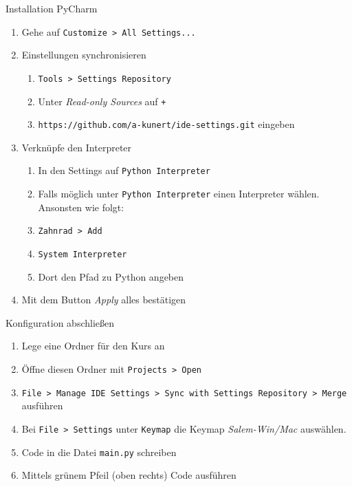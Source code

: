 \begin{frame}
\begin{block}{Installation PyCharm}
\vspace{2pt}
\begin{enumerate}
\item Gehe auf \texttt{Customize > All Settings...}
\item Einstellungen synchronisieren
\begin{enumerate}
	\item \texttt{Tools > Settings Repository}
	\item Unter \textit{Read-only Sources} auf \texttt{+}
	\item \texttt{https://github.com/a-kunert/ide-settings.git}	eingeben
\end{enumerate}
\item Verknüpfe den Interpreter
\begin{enumerate}
	\item In den Settings auf \texttt{Python Interpreter}
	\item Falls möglich unter \texttt{Python Interpreter} einen Interpreter wählen. Ansonsten wie folgt: 
	\item \texttt{Zahnrad > Add}
	\item \texttt{System Interpreter}
	\item Dort den Pfad zu Python angeben
\end{enumerate}
\item Mit dem Button \textit{Apply} alles bestätigen
\end{enumerate}
\end{block}
\end{frame}

\begin{frame}
\begin{block}{Konfiguration abschließen}
\begin{enumerate}
\item Lege eine Ordner für den Kurs an
\item Öffne diesen Ordner mit \texttt{Projects > Open}
\item \texttt{File > Manage IDE Settings > Sync with Settings Repository > Merge} ausführen
\item Bei \texttt{File > Settings} unter \texttt{Keymap} die Keymap \textit{Salem-Win/Mac} auswählen. 
\item Code in die Datei \texttt{main.py} schreiben
\item Mittels grünem Pfeil (oben rechts) Code ausführen
\end{enumerate}	
\end{block}
\end{frame}